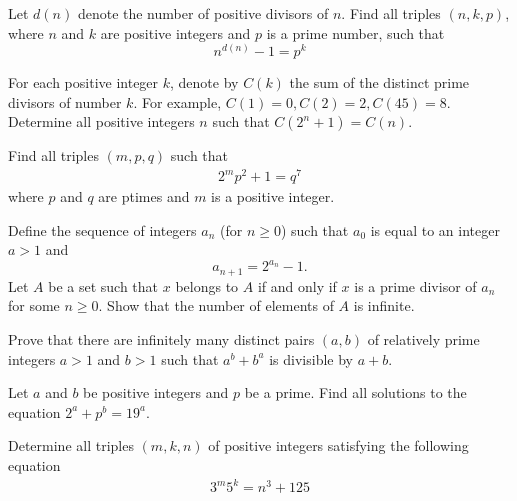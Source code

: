 \documentclass{subfile}
\begin{document}
	\begin{problem} %
		Let $d(n)$ denote the number of positive divisors of $n$. Find all triples $(n,k,p)$, where $n$ and $k$ are positive integers and $p$ is a prime number, such that
		\[n^{d(n)} - 1 = p^k\]
	\end{problem}

	\begin{problem}[IZHO 2017] %
		For each positive integer $k$, denote by $C(k)$ the sum of the distinct prime divisors of number $k$. For example, $C(1)=0,C(2)=2,C(45)=8$. Determine all positive integers $n$ such that $C(2^n+1)=C(n)$.
	\end{problem}

	\begin{problem} %
		Find all triples $(m,p,q)$ such that
			\begin{align*} 2^mp^2 +1=q^7 \end{align*}
		where $p$ and $q$ are ptimes and $m$ is a positive integer.
	\end{problem}

	\begin{problem}[Brazil 2016] %
		Define the sequence of integers $a_n$ (for $n \geq 0$) such that $a_0$ is equal to an integer $a>1$ and $$a_{n+1}=2^{a_n}-1.$$
		Let $A$ be a set such that $x$ belongs to $A$ if and only if $x$ is a prime divisor of $a_n$ for some $n \geq 0$. Show that the number of elements of $A$ is infinite.
	\end{problem}

	\begin{problem}[USAMO‌2017] %
		Prove that there are infinitely many distinct pairs $(a, b)$ of relatively prime integers $a>1$ and $b>1$ such that $a^b+b^a$ is divisible by $a+b$.
	\end{problem}

	\begin{problem} %
		Let $a$ and $b$ be positive integers and $p$ be a prime. Find all solutions to the equation $2^a+p^b=19^a$.
	\end{problem}

	\begin{problem} %
		Determine all triples $(m,k,n)$ of positive integers satisfying the following equation
			\begin{align*}
				3^m5^k=n^3+125
			\end{align*}
	\end{problem}
\end{document}
